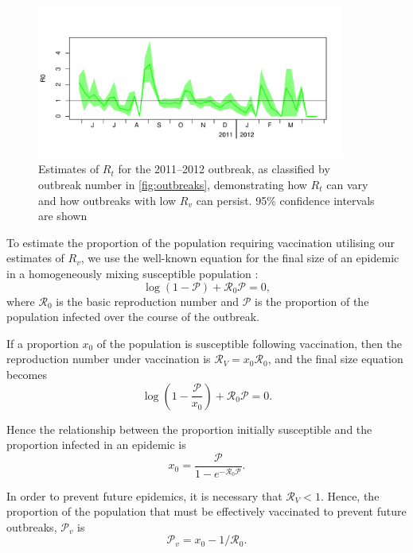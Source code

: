 \documentclass{article}
\newcommand{\Pe}{\mathcal{P}}
\newcommand{\Ro}{\mathcal{R}_0}
\newcommand{\Pv}{\mathcal{P}_v}
\newcommand{\Rr}{\mathcal{R}}
\begin{document}
\begin{figure}
\begin{center}
     \includegraphics[width=0.9\textwidth]{R0_outbreak33.pdf}
     \end{center}
     \caption{Estimates of $R_t$ for the 2011--2012 outbreak, as classified by outbreak number in \autoref{fig:outbreaks}, demonstrating how  $R_t$ can vary and how outbreaks with low  $R_v$ can persist. 95\% confidence intervals are shown}
     \label{fig:r0_2011}
\end{figure}

To estimate the proportion of the population requiring vaccination utilising our estimates of $R_v$, we use the well-known equation for the final size of an epidemic in a homogeneously mixing susceptible population \citep{diekmann13}:
\begin{equation} \label{eq:eqn1}
\log\left(1-\Pe\right)+\Ro\Pe=0,
\end{equation}
where $\Ro$ is the basic reproduction number and $\Pe$ is the proportion of the population infected over the course of the outbreak.

If a proportion $x_0$ of the population is susceptible following vaccination, then the  reproduction number under vaccination is $\Rr_V=x_0\Ro$, and the final size equation becomes
\begin{equation} \label{eq:eqn2}
\log\left(1-\frac{\Pe}{x_0}\right)+\Ro\Pe=0.
\end{equation}

Hence the relationship between the proportion initially susceptible and the proportion infected in an epidemic is
\begin{equation} \label{eq:eqn3}
x_0=\frac{\Pe}{1-e^{-\Ro\Pe}}.
\end{equation}

In order to prevent future epidemics, it is necessary that $\Rr_V<1$. Hence, the proportion of the population that must be effectively vaccinated to prevent future outbreaks, $\Pv$ is
\begin{equation} \label{eq:prop}
\Pv = x_0-1/\Ro.
\end{equation}
\end{document}
